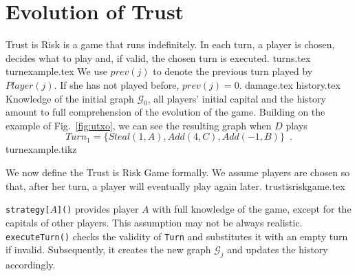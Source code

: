 \section{Evolution of Trust}
  Trust is Risk is a game that runs indefinitely. In each turn, a player is chosen, decides what to play and, if valid, the
  chosen turn is executed.
  {turns.tex}
  {turnexample.tex}
  We use $prev\left(j\right)$ to denote the previous turn played by $Player(j)$. If she has not played before,
  $prev\left(j\right) = 0$.
  {damage.tex}
  {history.tex}
  \noindent Knowledge of the initial graph $\mathcal{G}_0$, all players' initial capital and the history amount to full
  comprehension of the evolution of the game. Building on the example of Fig.~\ref{fig:utxo}, we can see the resulting graph
  when $D$ plays
  \begin{equation}
  \label{turnexample}
     Turn_1 = \{Steal\left(1, A\right), Add\left(4, C\right), Add\left(-1, B\right)\} \enspace.
  \end{equation}
  {turnexample.tikz}

  \noindent We now define the Trust is Risk Game formally. We assume players are chosen so that, after her turn, a player will
  eventually play again later.
  {trustisriskgame.tex}

  \noindent \texttt{strategy[}$A$\texttt{]()} provides player $A$ with full knowledge of the game, except for the capitals of
  other players. This assumption may not be always realistic. \texttt{executeTurn()} checks the validity of \texttt{Turn} and
  substitutes it with an empty turn if invalid. Subsequently, it creates the new graph $\mathcal{G}_j$ and updates the
  history accordingly.
